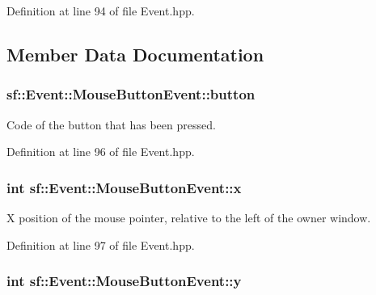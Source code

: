 Definition at line 94 of file Event.\-hpp.



\subsection{Member Data Documentation}
\hypertarget{structsf_1_1_event_1_1_mouse_button_event_a5f53725aa7b647705486eeb95f723024}{
\subsubsection[{button}]{ sf\-::\-Event\-::\-Mouse\-Button\-Event\-::button}}\label{structsf_1_1_event_1_1_mouse_button_event_a5f53725aa7b647705486eeb95f723024}


Code of the button that has been pressed. 



Definition at line 96 of file Event.\-hpp.

\hypertarget{structsf_1_1_event_1_1_mouse_button_event_a49b937b311729174950787781aafcdc7}{
\subsubsection[{x}]{\setlength{\rightskip}{0pt plus 5cm}int sf\-::\-Event\-::\-Mouse\-Button\-Event\-::x}}\label{structsf_1_1_event_1_1_mouse_button_event_a49b937b311729174950787781aafcdc7}


X position of the mouse pointer, relative to the left of the owner window. 



Definition at line 97 of file Event.\-hpp.

\hypertarget{structsf_1_1_event_1_1_mouse_button_event_aae4735071868d4411d1782bf67619d64}{
\subsubsection[{y}]{\setlength{\rightskip}{0pt plus 5cm}int sf\-::\-Event\-::\-Mouse\-Button\-Event\-::y}}\label{structsf_1_1_event_1_1_mouse_button_event_aae4735071868d4411d1782bf67619d64}


